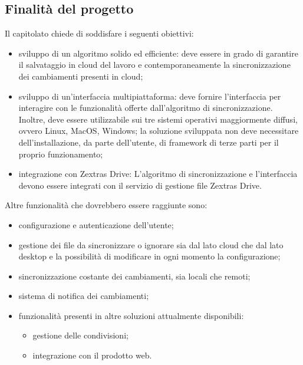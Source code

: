   \subsection{Finalità del progetto}
Il capitolato chiede di soddisfare i seguenti obiettivi:
  \begin{itemize}
    \item  sviluppo di un algoritmo solido ed efficiente:  deve essere in grado di garantire il salvataggio in cloud del lavoro e contemporaneamente la sincronizzazione dei cambiamenti presenti in cloud;
    \item sviluppo di un’interfaccia multipiattaforma: deve fornire l'interfaccia per interagire con le funzionalità offerte dall'algoritmo di sincronizzazione. Inoltre, deve essere utilizzabile sui tre sistemi operativi maggiormente diffusi, ovvero Linux, MacOS, Windows;
la soluzione sviluppata non deve necessitare dell'installazione, da parte dell'utente, di framework di terze parti per il proprio funzionamento;
    \item integrazione con Zextras Drive: L'algoritmo di sincronizzazione e l'interfaccia devono essere integrati con il servizio di gestione file Zextras Drive.
  \end{itemize}
Altre funzionalità che dovrebbero essere raggiunte sono:
\begin{itemize}
\item configurazione e autenticazione dell'utente;
\item gestione dei file da sincronizzare o ignorare sia dal lato cloud che dal lato desktop e la possibilità di modificare in ogni momento la configurazione;
\item sincronizzazione costante dei cambiamenti, sia locali che remoti;
\item sistema di notifica dei cambiamenti;
\item funzionalità presenti in altre soluzioni attualmente disponibili:
    \begin{itemize}
    \item gestione delle condivisioni;
    \item integrazione con il prodotto web.
    \end{itemize}
\end{itemize}

